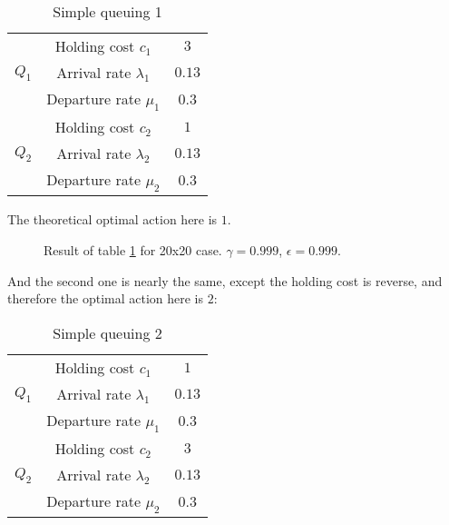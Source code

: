 \documentclass[
  a4paper, xcolor = usenames,dvipsnames]{article}
\theoremstyle{definition}
\theoremstyle{definition}
\theoremstyle{definition}
\theoremstyle{definition}
\theoremstyle{remark}
\begin{document}
\begin{table}[!htbp]
\caption{Simple queuing 1}
\begin{center}
\begin{tabular}{c c c}
    \hline
    \multirow{3}{*}{$Q_{1}$} & Holding cost $c_{1}$ & $3$ \\
    & Arrival rate $\lambda_{1}$ & $0.13$ \\
    & Departure rate $\mu_{1}$ & $0.3$ \\
    \cline{2-3}
    \multirow{3}{*}{$Q_{2}$} & Holding cost $c_{2}$ & $1$ \\
    & Arrival rate $\lambda_{2}$ & $0.13$ \\
    & Departure rate $\mu_{2}$ & $0.3$ \\    
    \hline
\end{tabular}
\end{center}
\label{tab:simple-queuing-1}
\end{table}

The theoretical optimal action here is \(1\).



\begin{figure}

{\centering {}

}

\caption{Result of table \ref{tab:simple-queuing-1} for 20x20 case. \(\gamma = 0.999\), \(\epsilon = 0.999\).}\label{fig:20x20-simple-queuing-1}
\end{figure}

And the second one is nearly the same, except the holding cost is reverse, and therefore the optimal action here is \(2\):

\begin{table}[!htbp]
\caption{Simple queuing 2}
\begin{center}
\begin{tabular}{c c c}
    \hline
    \multirow{3}{*}{$Q_{1}$} & Holding cost $c_{1}$ & $1$ \\
    & Arrival rate $\lambda_{1}$ & $0.13$ \\
    & Departure rate $\mu_{1}$ & $0.3$ \\
    \cline{2-3}
    \multirow{3}{*}{$Q_{2}$} & Holding cost $c_{2}$ & $3$ \\
    & Arrival rate $\lambda_{2}$ & $0.13$ \\
    & Departure rate $\mu_{2}$ & $0.3$ \\    
    \hline
\end{tabular}
\end{center}
\label{tab:simple-queuing-2}
\end{table}
\end{document}
